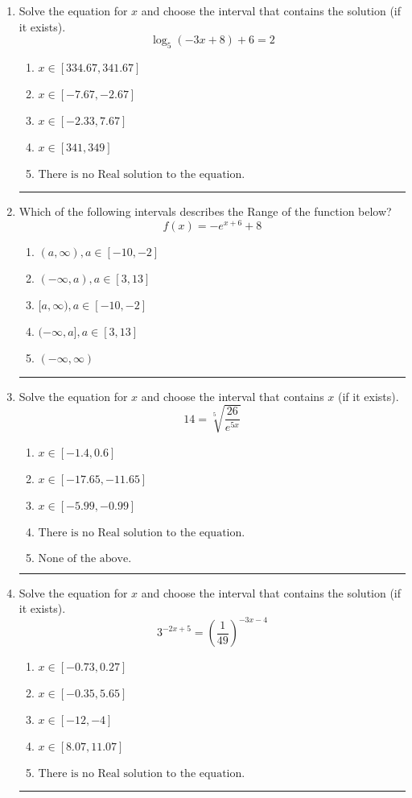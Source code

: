 \documentclass[14pt]{extbook}
\newcommand{\litem}[1]{\item#1\hspace*{-1cm}\rule{\textwidth}{0.4pt}}
\begin{document}
\begin{enumerate}
\litem{
Solve the equation for $x$ and choose the interval that contains the solution (if it exists).\[ \log_{5}{(-3x+8)}+6 = 2 \]\begin{enumerate}[label=\Alph*.]
\item \( x \in [334.67, 341.67] \)
\item \( x \in [-7.67, -2.67] \)
\item \( x \in [-2.33, 7.67] \)
\item \( x \in [341, 349] \)
\item \( \text{There is no Real solution to the equation.} \)

\end{enumerate} }
\litem{
Which of the following intervals describes the Range of the function below?\[ f(x) = -e^{x+6}+8 \]\begin{enumerate}[label=\Alph*.]
\item \( (a, \infty), a \in [-10, -2] \)
\item \( (-\infty, a), a \in [3, 13] \)
\item \( [a, \infty), a \in [-10, -2] \)
\item \( (-\infty, a], a \in [3, 13] \)
\item \( (-\infty, \infty) \)

\end{enumerate} }
\litem{
 Solve the equation for $x$ and choose the interval that contains $x$ (if it exists).\[  14 = \sqrt[5]{\frac{26}{e^{5x}}} \]\begin{enumerate}[label=\Alph*.]
\item \( x \in [-1.4, 0.6] \)
\item \( x \in [-17.65, -11.65] \)
\item \( x \in [-5.99, -0.99] \)
\item \( \text{There is no Real solution to the equation.} \)
\item \( \text{None of the above.} \)

\end{enumerate} }
\litem{
Solve the equation for $x$ and choose the interval that contains the solution (if it exists).\[ 3^{-2x+5} = \left(\frac{1}{49}\right)^{-3x-4} \]\begin{enumerate}[label=\Alph*.]
\item \( x \in [-0.73, 0.27] \)
\item \( x \in [-0.35, 5.65] \)
\item \( x \in [-12, -4] \)
\item \( x \in [8.07, 11.07] \)
\item \( \text{There is no Real solution to the equation.} \)


\end{enumerate}}
\end{enumerate}
\end{document}
